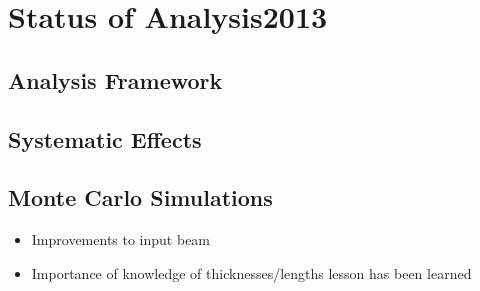 \section{Status of Analysis2013}

\subsection{Analysis Framework}

\subsection{Systematic Effects}

\subsection{Monte Carlo Simulations}
\begin{itemize}
  \item{Improvements to input beam}
  \item{Importance of knowledge of thicknesses/lengths lesson has been learned}
\end{itemize}
